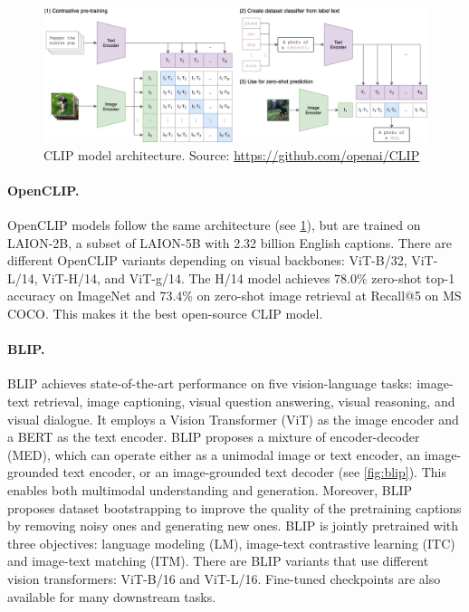 \begin{figure}[ht]
    \centering
    \includegraphics[width=\linewidth]{images/models/clip.png}
    \caption{CLIP model architecture. Source: \url{https://github.com/openai/CLIP}}
    \label{fig:clip}
\end{figure}

\paragraph{OpenCLIP.} OpenCLIP \cite{ilharco_gabriel_2021_5143773} models follow the same architecture (see \cref{fig:clip}), but are trained on LAION-2B, a subset of LAION-5B \cite{schuhmann2022laionb} with 2.32 billion English captions. There are different OpenCLIP variants depending on visual backbones: ViT-B/32, ViT-L/14, ViT-H/14, and ViT-g/14. The H/14 model achieves 78.0\% zero-shot top-1 accuracy on ImageNet and 73.4\% on zero-shot image retrieval at Recall@5 on MS COCO. This makes it the best open-source CLIP model.

\paragraph{BLIP.} BLIP \cite{li2022blip} achieves state-of-the-art performance on five vision-language tasks: image-text retrieval, image captioning, visual question answering, visual reasoning, and visual dialogue. It employs a Vision Transformer (ViT) \cite{dosovitskiy2020imageworth} as the image encoder and a BERT as the text encoder. BLIP proposes a mixture of encoder-decoder (MED), which can operate either as a unimodal image or text encoder, an image-grounded text encoder, or an image-grounded text decoder (see \cref{fig:blip}). This enables both multimodal understanding and generation. Moreover, BLIP proposes dataset bootstrapping to improve the quality of the pretraining captions by removing noisy ones and generating new ones. BLIP is jointly pretrained with three objectives: language modeling (LM), image-text contrastive learning (ITC) and image-text matching (ITM). There are BLIP variants that use different vision transformers: ViT-B/16 and ViT-L/16. Fine-tuned checkpoints are also available for many downstream tasks.

